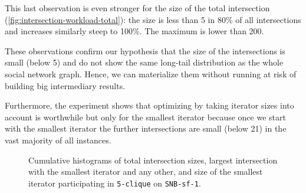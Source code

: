 This last observation is even stronger for the size of the total intersection (\cref{fig:intersection-workload-total}):
the size is less than 5 in 80\% of all intersections and increases similarly steep to 100\%.
The maximum is lower than 200.

These observations confirm our hypothesis that the size of the intersections is small (below 5) and do not show the same long-tail
distribution as the whole social network graph.
Hence, we can materialize them without running at risk of building big intermediary results.

Furthermore, the experiment shows that optimizing by taking iterator sizes into account is worthwhile but only for the smallest iterator
because
once we start with the smallest iterator the further intersections are small (below 21) in the vast majority of all instances.


\begin{figure}[H]
\centering
{}
\hfill
{}
\hfill
{}
\caption{Cumulative histograms of total intersection sizes, largest intersection with the smallest iterator and any other, and size of the
smallest iterator participating in \texttt{5-clique} on \texttt{SNB-sf-1}.}
\label{fig:intersection-workload}
\end{figure}

